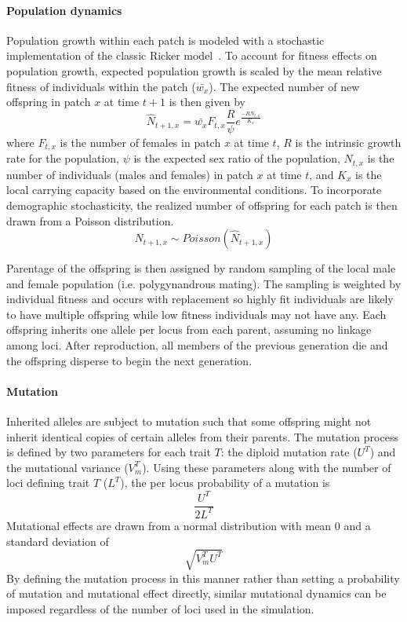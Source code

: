 \documentclass[12pt, oneside]{article}
\begin{document}
\paragraph{Population dynamics}
Population growth within each patch is modeled with a stochastic implementation of the classic Ricker model~\citep{ricker1954stock, melbourne2008extinction}. To account for fitness effects on population growth, expected population growth is scaled by the mean relative fitness of individuals within the patch ($\bar{w_{x}}$). The expected number of new offspring in patch $x$ at time $t+1$ is then given by
\begin{equation}
\hat{N}_{t+1,x}=\bar{w_{x}}F_{t,x}\frac{R}{\psi}e^{\frac{-RN_{t,x}}{K_{x}}}
\end{equation}
where $F_{t,x}$ is the number of females in patch $x$ at time $t$, $R$ is the intrinsic growth rate for the population, $\psi$ is the expected sex ratio of the population, $N_{t,x}$ is the number of individuals (males and females) in patch $x$ at time $t$, and $K_{x}$ is the local carrying capacity based on the environmental conditions. To incorporate demographic stochasticity, the realized number of offspring for each patch is then drawn from a Poisson distribution.
\begin{equation}
N_{t+1,x}\sim Poisson(\hat{N}_{t+1,x})
\end{equation}

Parentage of the offspring is then assigned by random sampling of the local male and female population (i.e. polygynandrous mating). The sampling is weighted by individual fitness and occurs with replacement so highly fit individuals are likely to have multiple offspring while low fitness individuals may not have any. Each offspring inherits one allele per locus from each parent, assuming no linkage among loci. After reproduction, all members of the previous generation die and the offspring disperse to begin the next generation.

\paragraph{Mutation}
Inherited alleles are subject to mutation such that some offspring might not inherit identical copies of certain alleles from their parents. The mutation process is defined by two parameters for each trait $T$: the diploid mutation rate ($U^{T}$) and the mutational variance ($V_{m}^{T}$). Using these parameters along with the number of loci defining trait $T$ ($L^{T}$), the per locus probability of a mutation is
\begin{equation}
\frac{U^{T}}{2L^{T}}
\end{equation}
Mutational effects are drawn from a normal distribution with mean $0$ and a standard deviation of
\begin{equation}
\sqrt{V_{m}^{T}U^{T}}
\end{equation}
By defining the mutation process in this manner rather than setting a probability of mutation and mutational effect directly, similar mutational dynamics can be imposed regardless of the number of loci used in the simulation.
\end{document}
